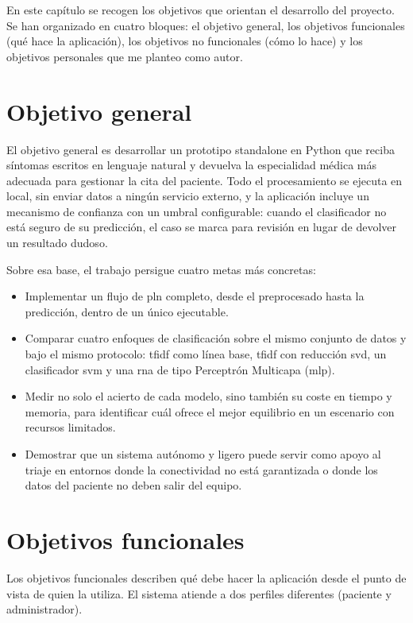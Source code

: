 
En este capítulo se recogen los objetivos que orientan el desarrollo del proyecto. Se han organizado en cuatro bloques: el objetivo general, los objetivos funcionales (qué hace la aplicación), los objetivos no funcionales (cómo lo hace) y los objetivos personales que me planteo como autor.

\section{Objetivo general}

El objetivo general es desarrollar un prototipo \gls{standalone} en Python que reciba síntomas escritos en lenguaje natural y devuelva la especialidad médica más adecuada para gestionar la cita del paciente. Todo el procesamiento se ejecuta en local, sin enviar datos a ningún servicio externo, y la aplicación incluye un mecanismo de confianza con un umbral configurable: cuando el clasificador no está seguro de su predicción, el caso se marca para revisión en lugar de devolver un resultado dudoso.

Sobre esa base, el trabajo persigue cuatro metas más concretas:

\begin{itemize}
	\item Implementar un flujo de \gls{pln} completo, desde el preprocesado hasta la predicción, dentro de un único ejecutable.
	\item Comparar cuatro enfoques de clasificación sobre el mismo conjunto de datos y bajo el mismo protocolo: \gls{tfidf} como línea base, \gls{tfidf} con reducción \gls{svd}, un clasificador \gls{svm} y una \gls{rna} de tipo Perceptrón Multicapa (\gls{mlp}).
	\item Medir no solo el acierto de cada modelo, sino también su coste en tiempo y memoria, para identificar cuál ofrece el mejor equilibrio en un escenario con recursos limitados.
	\item Demostrar que un sistema autónomo y ligero puede servir como apoyo al triaje en entornos donde la conectividad no está garantizada o donde los datos del paciente no deben salir del equipo.
\end{itemize}

\section{Objetivos funcionales}

Los objetivos funcionales describen qué debe hacer la aplicación desde el punto de vista de quien la utiliza. El sistema atiende a dos perfiles diferentes (paciente y administrador).

